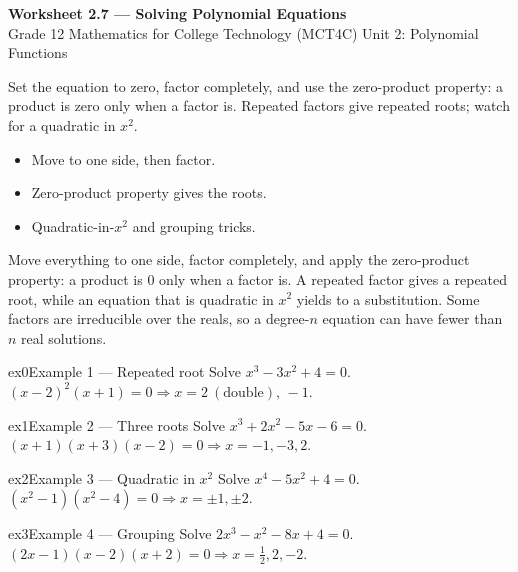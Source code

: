 \documentclass[11pt]{article}
\begin{document}
\begin{center}
{\LARGE\bfseries\color{titleblue}Worksheet 2.7 --- Solving Polynomial Equations}\\[2pt]
{\small Grade 12 Mathematics for College Technology (MCT4C) \textperiodcentered{} Unit 2: Polynomial Functions}
\end{center}

\begin{ideabox}
Set the equation to zero, factor completely, and use the zero-product property: a product is zero only when a factor is. Repeated factors give repeated roots; watch for a quadratic in $x^2$.
\begin{itemize}[leftmargin=*,itemsep=2pt]
  \item Move to one side, then factor.
  \item Zero-product property gives the roots.
  \item Quadratic-in-$x^2$ and grouping tricks.
\end{itemize}
\end{ideabox}

\begin{learnbox}
Move everything to one side, factor completely, and apply the zero-product property: a product is $0$ only when a factor is.
A repeated factor gives a repeated root, while an equation that is quadratic in $x^2$ yields to a substitution.
Some factors are irreducible over the reals, so a degree-$n$ equation can have fewer than $n$ real solutions.
\end{learnbox}


\begin{example}{ex0}{Example 1 --- Repeated root}
Solve $x^3-3x^2+4=0$.\soln $(x-2)^2(x+1)=0\Rightarrow x=2\ (\text{double}),\,-1$.
\end{example}

\begin{example}{ex1}{Example 2 --- Three roots}
Solve $x^3+2x^2-5x-6=0$.\soln $(x+1)(x+3)(x-2)=0\Rightarrow x=-1,-3,2$.
\end{example}

\begin{example}{ex2}{Example 3 --- Quadratic in $x^2$}
Solve $x^4-5x^2+4=0$.\soln $(x^2-1)(x^2-4)=0\Rightarrow x=\pm1,\pm2$.
\end{example}

\begin{example}{ex3}{Example 4 --- Grouping}
Solve $2x^3-x^2-8x+4=0$.\soln $(2x-1)(x-2)(x+2)=0\Rightarrow x=\tfrac12,2,-2$.
\end{example}
\end{document}
